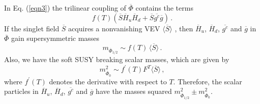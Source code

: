 In Eq. (\ref{eqn3}) the trilinear coupling of ${\overline \Phi}$ 
contains the terms 
\begin{equation}
    f(T)(\overline{S}\overline{H}_{u}\overline{H}_{d} + 
            \overline{S}\overline{g^{c}}\overline{g})\,.
\label{eqn4}
\end{equation}
If the singlet field $\overline{S}$ acquires a nonvanishing VEV 
$\langle \overline{S} \rangle$ \cite{E6}, 
then $\overline{H}_{u}$, $\overline{H}_{d}$, $\overline{g^{c}}$ 
and $\overline{g}$ in ${\overline \Phi}$ gain supersymmetric masses 
\begin{equation}
    m_{\overline \Phi_{1/2}} \sim f(T) \, \langle \overline{S} \rangle \,.
\label{eqn5}
\end{equation}
Also, we have the soft SUSY breaking scalar masses, 
which are given by 
\begin{equation}
   m_{\overline \Phi_{0}}^2 \sim f^{\prime}(T) 
                          F^{T}\langle \overline{S} \rangle \,, 
\label{eqn6}
\end{equation}
where $f^{\prime}(T)$ denotes the derivative with respect to $T$.
Therefore, the scalar particles in $\overline{H}_{u}$, $\overline{H}_{d}$, 
$\overline{g^{c}}$ and $\overline{g}$ have the masses squared 
$m_{\overline \Phi_{1/2}}^2 \pm m_{\overline \Phi_{0}}^2$. 

